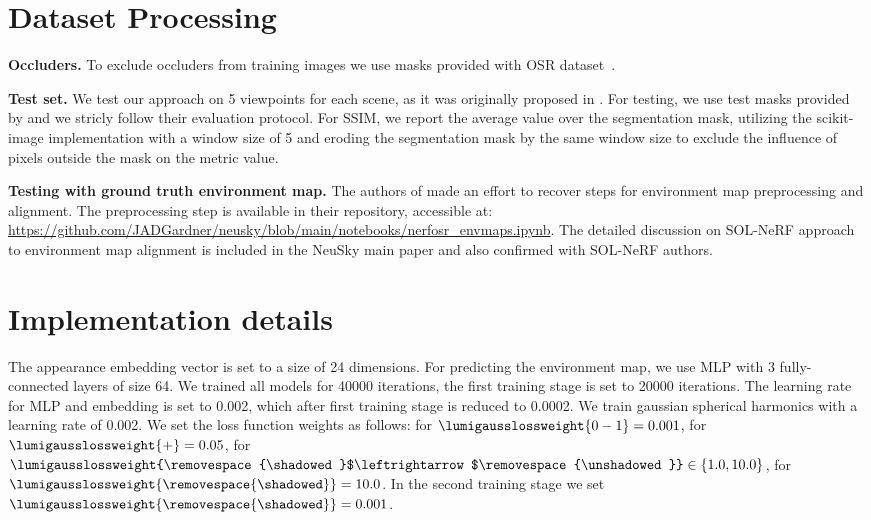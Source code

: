 
\section{Dataset Processing}

  \textbf{Occluders.
  }
  To exclude occluders from training images we use masks provided with OSR
  dataset~\cite{rudnev2022nerfosr}.

  \textbf{Test set.}
  We test our approach on 5 viewpoints for each scene, as it was originally
  proposed in \cite{rudnev2022nerfosr}.
  For testing, we use test masks provided by \cite{rudnev2022nerfosr} and we
  stricly follow their evaluation protocol.
  For SSIM, we report the average value over the segmentation mask, utilizing
  the scikit-image implementation with a window size of 5 and eroding the
  segmentation mask by the same window size to exclude the influence of pixels
  outside the mask on the metric value.

  \textbf{Testing with ground truth environment map.}
  The authors of \cite{gardner2023neusky} made an effort to recover steps for
  environment map preprocessing and alignment.
  The preprocessing step is available in their repository, accessible at:
  \url{https://github.com/JADGardner/neusky/blob/main/notebooks/nerfosr_envmaps.ipynb}.
  The detailed discussion on SOL-NeRF \cite{solnerf} approach to environment
  map alignment is included in the NeuSky main paper \cite{gardner2023neusky}
  and also confirmed with SOL-NeRF authors.

\section{Implementation details}

  The appearance embedding vector is set to a size of 24 dimensions.
  For predicting the environment map, we use MLP with 3 fully-connected layers
  of size 64.
  We trained all models for 40000 iterations, the first training stage is set
  to 20000 iterations.
  The learning rate for MLP and embedding is set to 0.002, which after first
  training stage is reduced to 0.0002.
  We train gaussian spherical harmonics with a learning rate of 0.002.
  We set the loss function weights as follows: for
  $\lumigausslossweight{0-1}=0.001$, for $\lumigausslossweight{+}=0.05$, for
  $\lumigausslossweight{\removespace{\shadowed}$\leftrightarrow$\removespace{\unshadowed}}
  \in \{1.0, 10.0\}$, for
  $\lumigausslossweight{\removespace{\shadowed}}=10.0$.
  In the second training stage we set
  $\lumigausslossweight{\removespace{\shadowed}}=0.001$.

